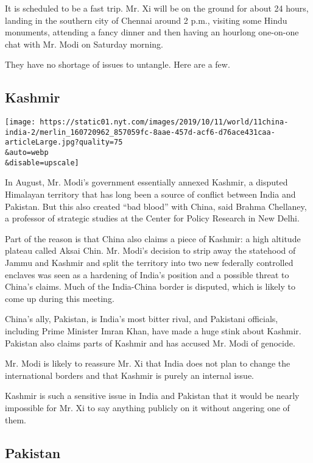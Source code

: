 It is scheduled to be a fast trip. Mr. Xi will be on the ground for
about 24 hours, landing in the southern city of Chennai around 2 p.m.,
visiting some Hindu monuments, attending a fancy dinner and then having
an hourlong one-on-one chat with Mr. Modi on Saturday morning.

They have no shortage of issues to untangle. Here are a few.

\hypertarget{kashmir}{%
\subsection{Kashmir}\label{kashmir}}

\texttt{[image: https://static01.nyt.com/images/2019/10/11/world/11china-india-2/merlin\_160720962\_857059fc-8aae-457d-acf6-d76ace431caa-articleLarge.jpg?quality=75\\\&auto=webp\\\&disable=upscale]}

In August, Mr. Modi's government essentially annexed Kashmir, a disputed
Himalayan territory that has long been a source of conflict between
India and Pakistan. But this also created ``bad blood'' with China, said
Brahma Chellaney, a professor of strategic studies at the Center for
Policy Research in New Delhi.

Part of the reason is that China also claims a piece of Kashmir: a high
altitude plateau called Aksai Chin. Mr. Modi's decision to strip away
the statehood of Jammu and Kashmir and split the territory into two new
federally controlled enclaves was seen as a hardening of India's
position and a possible threat to China's claims. Much of the
India-China border is disputed, which is likely to come up during this
meeting.

China's ally, Pakistan, is India's most bitter rival, and Pakistani
officials, including Prime Minister Imran Khan, have made a huge stink
about Kashmir. Pakistan also claims parts of Kashmir and has accused Mr.
Modi of genocide.

Mr. Modi is likely to reassure Mr. Xi that India does not plan to change
the international borders and that Kashmir is purely an internal issue.

Kashmir is such a sensitive issue in India and Pakistan that it would be
nearly impossible for Mr. Xi to say anything publicly on it without
angering one of them.

\hypertarget{pakistan}{%
\subsection{Pakistan}\label{pakistan}}


